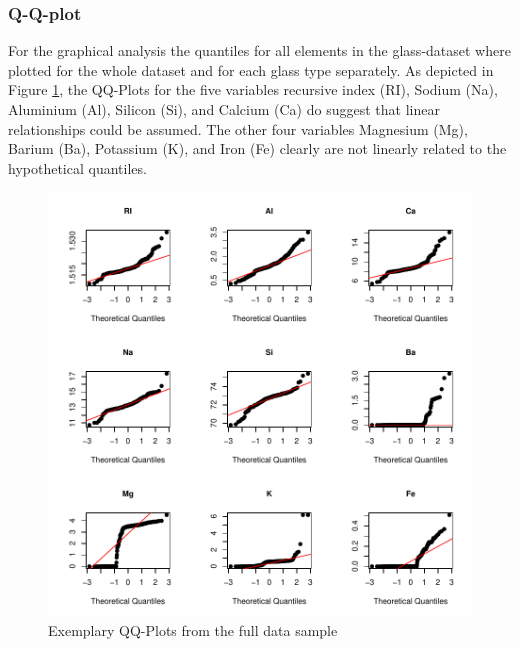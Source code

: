 \documentclass[a4paper, 12pt, titlepage, headsepline, listof = totoc, bibliography = totoc, numbers = noenddot]{scrartcl}
\begin{document}
\subsubsection{Q-Q-plot}\label{sec:qq-original}
For the graphical analysis the quantiles for all elements in the glass-dataset where plotted for the whole dataset and for each glass type separately. As depicted in Figure \ref{fig:QQfull}, the QQ-Plots for the five variables recursive index (RI), Sodium (Na), Aluminium (Al), Silicon (Si), and Calcium (Ca) do suggest that linear relationships could be assumed. The other four variables Magnesium (Mg), Barium (Ba), Potassium (K), and Iron (Fe) clearly are not linearly related to the hypothetical quantiles.

\begin{figure}[h!]
\centering
\includegraphics[width=\textwidth]{report-QQfull}
\caption{Exemplary QQ-Plots from the full data sample}
\label{fig:QQfull}
\end{figure}
\end{document}
